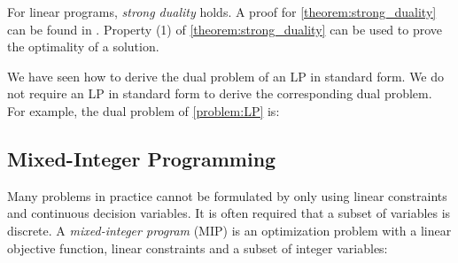 For linear programs, \textit{strong duality} holds. A proof for \cref{theorem:strong_duality} can be found in \cite{aps_mosek_nodate}. Property (1) of \cref{theorem:strong_duality} can be used to prove the optimality of a solution. 

We have seen how to derive the dual problem of an LP in standard form. We do not require an LP in standard form to derive the corresponding dual problem. For example, the dual problem of \cref{problem:LP} is: 



\subsection{Mixed-Integer Programming} \label{section:MIP}
Many problems in practice cannot be formulated by only using linear constraints and continuous decision variables. It is often required that a subset of variables is discrete. A \textit{mixed-integer program} (MIP) is an optimization problem with a linear objective function, linear constraints and a subset of integer variables:



